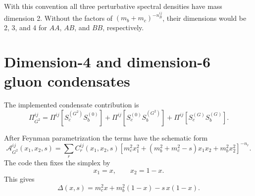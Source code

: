 \documentclass[11pt]{article}
\begin{document}
With this convention all three perturbative spectral densities have mass
dimension 2.  Without the factors of $(m_b+m_c)^{-n_B^{ij}}$, their
dimensions would be 2, 3, and 4 for $AA$, $AB$, and $BB$, respectively.

\section{Dimension-4 and dimension-6 gluon condensates}

The implemented condensate contribution is
\begin{equation}
  \Pi_{G^2}^{ij}
  =
  \Pi^{ij}[S_c^{(G^2)}S_b^{(0)}]
  +
  \Pi^{ij}[S_c^{(0)}S_b^{(G^2)}]
  +
  \Pi^{ij}[S_c^{(G)}S_b^{(G)}].
\end{equation}

After Feynman parametrization the terms have the schematic form
\begin{equation}
  \mathcal{A}_{G^2}^{ij}(x_1,x_2,s)
  =
  \sum_r
  C_r^{ij}(x_1,x_2,s)
  \left[
    m_c^2x_1^2
    +(m_b^2+m_c^2-s)x_1x_2
    +m_b^2x_2^2
  \right]^{-n_r}.
\end{equation}
The code then fixes the simplex by
\begin{equation}
  x_1=x,\qquad x_2=1-x.
\end{equation}
This gives
\begin{equation}
  \Delta(x,s)
  =
  m_c^2x+m_b^2(1-x)-s\,x(1-x).
\end{equation}
\end{document}
